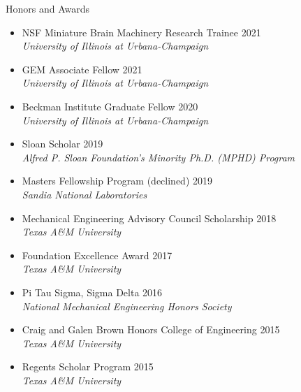 \documentclass{resume} %
\begin{document}
\begin{rSection}{Honors and Awards}
\begin{itemize}[label={}]
    \setlength\itemsep{0em}
    \item NSF Miniature Brain Machinery Research Trainee \hfill 2021 \\ 
    \textit{University of Illinois at Urbana-Champaign}
    \item GEM Associate Fellow \hfill 2021 \\ 
    \textit{University of Illinois at Urbana-Champaign}
    \item Beckman Institute Graduate Fellow \hfill 2020 \\
    \textit{University of Illinois at Urbana-Champaign}
    \item Sloan Scholar \hfill 2019 \\
    \textit{Alfred P. Sloan Foundation's Minority Ph.D. (MPHD) Program}
    \item Masters Fellowship Program (declined) \hfill 2019 \\
    \textit{Sandia National Laboratories}
    \item Mechanical Engineering Advisory
    Council Scholarship \hfill 2018 \\ \textit{Texas A\&M University}
    \item Foundation Excellence Award \hfill 2017 \\ \textit{Texas A\&M
    University}
    \item Pi Tau Sigma, Sigma Delta \hfill \hfill 2016 \\ \textit{National Mechanical
    Engineering Honors Society} 
    \item Craig and Galen Brown Honors College of Engineering \hfill 2015 \\
    \textit{Texas A\&M University}
    \item Regents Scholar Program \hfill 2015\\ \textit{Texas A\&M University}
\end{itemize}
\end{rSection}
\end{document}
